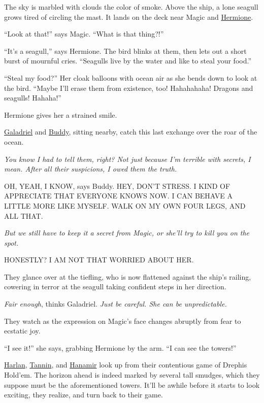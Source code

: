 \documentclass[smalldemyvopaper,11pt,twoside,onecolumn,openright,extrafontsizes]{memoir}
\begin{document}
The sky is marbled with clouds the color of smoke. Above the ship, a
lone seagull grows tired of circling the mast. It lands on the deck near
Magic and \href{/characters/hermione/}{Hermione}.

``Look at that!'' says Magic. ``What is that thing?!''

``It's a seagull,'' says Hermione. The bird blinks at them, then lets
out a short burst of mournful cries. ``Seagulls live by the water and
like to steal your food.''

``Steal my food?'' Her cloak balloons with ocean air as she bends down
to look at the bird. ``Maybe I'll erase them from existence, too!
Hahahahaha! Dragons and seagulls! Hahaha!''

Hermione gives her a strained smile.

\href{/characters/galadriel/}{Galadriel} and
\href{/characters/buddy/}{Buddy}, sitting nearby, catch this last
exchange over the roar of the ocean.

\emph{You know I had to tell them, right? Not just because I'm terrible
with secrets, I mean. After all their suspicions, I owed them the
truth.}

OH, YEAH, I KNOW, says Buddy. HEY, DON'T STRESS. I KIND OF APPRECIATE
THAT EVERYONE KNOWS NOW. I CAN BEHAVE A LITTLE MORE LIKE MYSELF. WALK ON
MY OWN FOUR LEGS, AND ALL THAT.

\emph{But we still have to keep it a secret from Magic, or she'll try to
kill you on the spot.}

HONESTLY? I AM NOT THAT WORRIED ABOUT HER.

They glance over at the tiefling, who is now flattened against the
ship's railing, cowering in terror at the seagull taking confident steps
in her direction.

\emph{Fair enough}, thinks Galadriel. \emph{Just be careful. She can be
unpredictable.}

They watch as the expression on Magic's face changes abruptly from fear
to ecstatic joy.

``I see it!'' she says, grabbing Hermione by the arm. ``I can see the
towers!''

\href{/characters/harlan/}{Harlan}, \href{/characters/tannin/}{Tannin},
and \href{/characters/hanamir/}{Hanamir} look up from their contentious
game of Drephis Hold'em. The horizon ahead is indeed marked by several
tall smudges, which they suppose must be the aforementioned towers.
It'll be awhile before it starts to look exciting, they realize, and
turn back to their game.
\end{document}
